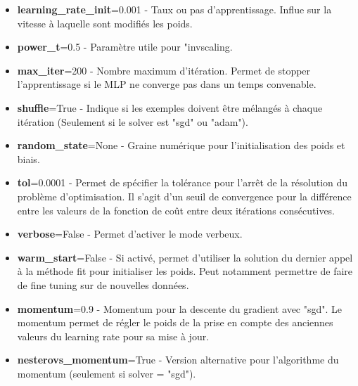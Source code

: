 \documentclass{ceri/sty/rapport}
\begin{document}
\begin{itemize}
    \item \textbf{learning\_rate\_init}=0.001 - Taux ou pas d'apprentissage. Influe sur la vitesse à laquelle sont modifiés les poids.\\
    
    \item \textbf{power\_t}=0.5 - Paramètre utile pour "invscaling.\\
    
    \item \textbf{max\_iter}=200 - Nombre maximum d'itération. Permet de stopper l'apprentissage si le MLP ne converge pas dans un temps convenable.\\
    
    \item \textbf{shuffle}=True - Indique si les exemples doivent être mélangés à chaque itération (Seulement si le solver est "sgd" ou "adam").\\
    
    \item \textbf{random\_state}=None - Graine numérique pour l'initialisation des poids et biais.\\
        
    \item \textbf{tol}=0.0001 - Permet de spécifier la tolérance pour l'arrêt de la résolution du problème d'optimisation. Il s'agit d'un seuil de convergence pour la différence entre les valeurs de la fonction de coût entre deux itérations consécutives.\\
    
    \item \textbf{verbose}=False - Permet d'activer le mode verbeux.\\
    
    \item \textbf{warm\_start}=False - Si activé, permet d'utiliser la solution du dernier appel à la méthode fit pour initialiser les poids. Peut notamment permettre de faire de fine tuning sur de nouvelles données.\\
    
    \item \textbf{momentum}=0.9 - Momentum pour la descente du gradient avec "sgd". Le momentum permet de régler le poids de la prise en compte des anciennes valeurs du learning rate pour sa mise à jour.\\
    
    \item \textbf{nesterovs\_momentum}=True - Version alternative pour l'algorithme du momentum (seulement si solver = "sgd").\\
    

\end{itemize}
\end{document}
